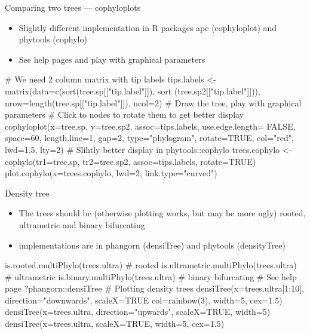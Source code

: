 \documentclass[compress, ucs, xelatex, 11pt, xcolor=x11names, aspectratio=169,
	hyperref={
		bookmarks=true,
		unicode=true,
		colorlinks=true,
		pdftitle={HybSeq course},
		plainpages=false,
		pdfauthor={Vojtech Zeisek},
		pdfsubject={Practical processing of HybSeq target enrichment sequencing data on computing grids like MetaCentrum},
		pdfcreator={XeLaTeX},
		pdfkeywords={BASH, command line, GNU, HybSeq, Linux, MetaCentrum, sequencing shell, target enrichment},
		linkcolor=Turquoise4, %
		anchorcolor=DodgerBlue4, %
		citecolor=DodgerBlue4, %
		filecolor=DodgerBlue4, %
		menucolor=Tan4, %
		urlcolor=DarkOliveGreen4, %
		pdftex},
	url={hyphens, lowtilde} %
	]{beamer}
\renewcommand{\texttt}[1]{\colorbox{Cornsilk2}{{\ttfamily #1}}}
\begin{document}
\begin{frame}[fragile]{Comparing two trees --- cophyloplots}
	\begin{itemize}
		\item Slightly different implementation in \texttt{R} packages \texttt{ape} (\texttt{cophyloplot}) and \texttt{phytools} (\texttt{cophylo})
		\item See help pages and play with graphical parameters
	\end{itemize}
	\begin{spluscode}
    # We need 2 column matrix with tip labels
    tips.labels <- matrix(data=c(sort(tree.sp[["tip.label"]]), sort
      (tree.sp2[["tip.label"]])), nrow=length(tree.sp[["tip.label"]]), ncol=2)
    # Draw the tree, play with graphical parameters
    # Click to nodes to rotate them to get better display
    cophyloplot(x=tree.sp, y=tree.sp2, assoc=tips.labels, use.edge.length=
      FALSE, space=60, length.line=1, gap=2, type="phylogram", rotate=TRUE,
      col="red", lwd=1.5, lty=2)
    # Slihtly better display in phytools::cophylo
    trees.cophylo <- cophylo(tr1=tree.sp, tr2=tree.sp2, assoc=tips.labels,
      rotate=TRUE)
    plot.cophylo(x=trees.cophylo, lwd=2, link.type="curved")
	\end{spluscode}
\end{frame}

\begin{frame}[fragile]{Density tree}
	\begin{itemize}
		\item The trees should be (otherwise plotting works, but may be more ugly) rooted, ultrametric and binary bifurcating
		\item implementations are in \texttt{phangorn} (\texttt{densiTree}) and \texttt{phytools} (\texttt{densityTree})
	\end{itemize}
	\begin{spluscode}
    is.rooted.multiPhylo(trees.ultra) # rooted
    is.ultrametric.multiPhylo(trees.ultra) # ultrametric
    is.binary.multiPhylo(trees.ultra) # binary bifurcating
    # See help page
    ?phangorn::densiTree
    # Plotting density trees
    densiTree(x=trees.ultra[1:10], direction="downwards", scaleX=TRUE
      col=rainbow(3), width=5, cex=1.5)
    densiTree(x=trees.ultra, direction="upwards", scaleX=TRUE, width=5)
    densiTree(x=trees.ultra, scaleX=TRUE, width=5, cex=1.5)
	\end{spluscode}
\end{frame}
\end{document}
